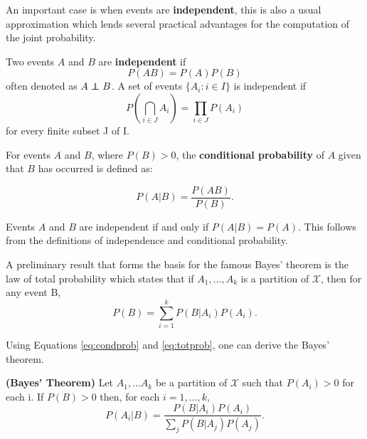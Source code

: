 An important case is when events are {\bf independent}, this is also a usual approximation which lends several practical advantages for the computation of the joint probability.\\

\fbox
{\begin{minipage}[h]{0.9\linewidth} 
\begin{definition}

Two events $A$ and $B$ are {\bf independent} if 
\begin{equation}
P(AB) = P(A)P(B)
\end{equation}
often denoted as $A \independent B $. A set of events $\{A_{i}: i \in I\}$ is independent if 
\begin{equation*}
P\left(\bigcap\limits_{i \in J} A_{i}\right) = \prod\limits_{i \in J}P(A_{i})
\end{equation*}
for every finite subset J of I.
\end{definition}
\end{minipage}}

\vspace{0.1in}
For events $A$ and $B$, where $P(B) > 0$, the {\bf conditional probability} of $A$ given that $B$ has occurred is defined as: 

\begin{equation} 
P(A|B)=\frac{P(AB)}{P(B)}.
\label{eq:condprob}
\end{equation}

Events $A$ and $B$ are independent if and only if $P(A|B)=P(A)$. This follows from the definitions of independence and conditional probability.


A preliminary result that forms the basis for the famous Bayes' theorem is the law of total probability which states that if $A_{1},\ldots,A_{k}$ is a partition of $\mathcal{X}$, then for any event B,
\begin{equation}
P(B)=\sum_{i=1}^{k}P(B|A_{i})P(A_{i}).
\label{eq:totprob}
\end{equation}


Using Equations \ref{eq:condprob}  and \ref{eq:totprob}, one can derive the Bayes' theorem.

\vspace{0.1in}
\fbox
{\begin{minipage}[h]{0.9\linewidth} 
\begin{theorem}
{\bf (Bayes' Theorem)} Let $A_{1}, \ldots A_{k}$ be a partition of $\mathcal{X}$ such that $P(A_{i}) > 0$ for each i. If $P(B) > 0$
then, for each $i=1,\ldots, k,$
\begin{equation}
P(A_{i}|B)=\frac{P(B|A_{i})P(A_{i})}{\sum_{j}P(B|A_{j})P(A_{j})}.
\end{equation}
\end{theorem}
\end{minipage}}

